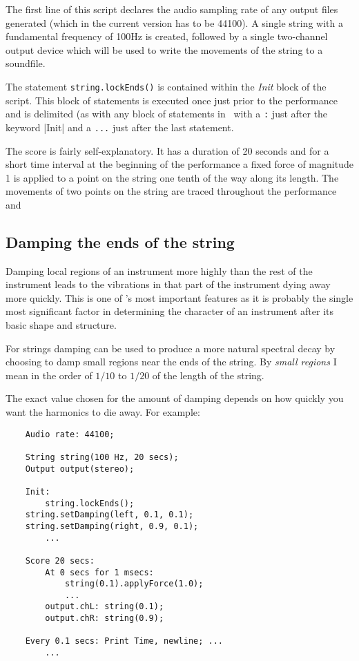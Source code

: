 The first line of this script declares the audio sampling rate of
any output files generated (which in the current version has to be
44100). A single string with a fundamental frequency of 100Hz is
created, followed by a single two-channel output device which will
be used to write the movements of the string to a soundfile.

The statement \verb|string.lockEnds()| is contained within the \emph{Init}
block of the script. This block of statements is executed once just prior
to the performance and is delimited (as with any block of statements in
\tao\ with a \verb|:| just after the keyword \Kwd|Init| and a \verb|...|
just after the last statement.

The score is fairly self-explanatory. It has a duration of 20 seconds
and for a short time interval at the beginning of the performance a
fixed force of magnitude 1 is applied to a point on the string one tenth
of the way along its length. The movements of two points on the string
are traced throughout the performance and

\subsection{Damping the ends of the string}
Damping local regions of an instrument more highly than the rest of
the instrument leads to the vibrations in that part of the instrument
dying away more quickly. This is one of \tao's most important
features as it is probably the single most significant factor in
determining the character of an instrument after its basic shape
and structure.

For strings damping can be used to produce a more natural spectral
decay by choosing to damp small regions near the ends of the string.
By \emph{small regions} I mean in the order of $1/10$ to $1/20$ of
the length of the string.

The exact value chosen for the amount of damping depends on how
quickly you want the harmonics to die away. For example:

\begin{verbatim}
    Audio rate: 44100;

    String string(100 Hz, 20 secs);
    Output output(stereo);

    Init:
        string.lockEnds();
	string.setDamping(left, 0.1, 0.1);
	string.setDamping(right, 0.9, 0.1);
        ...

    Score 20 secs:
        At 0 secs for 1 msecs:
            string(0.1).applyForce(1.0);
            ...
        output.chL: string(0.1);
        output.chR: string(0.9);

	Every 0.1 secs: Print Time, newline; ...
        ...
\end{verbatim}


